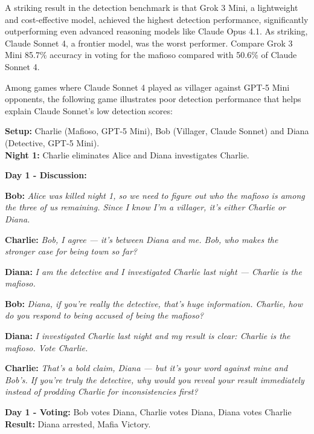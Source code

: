 \documentclass{article}
\begin{document}
A striking result in the detection benchmark is that Grok 3 Mini, a lightweight and cost-effective model, achieved the highest detection performance, significantly outperforming even advanced reasoning models like Claude Opus 4.1. As striking, Claude Sonnet 4, a frontier model, was the worst performer. Compare Grok 3 Mini 85.7\% accuracy in voting for the mafioso compared with 50.6\% of Claude Sonnet 4. 

Among games where Claude Sonnet 4 played as villager against GPT-5 Mini opponents, the following game illustrates poor detection performance that helps explain Claude Sonnet's low detection scores:

\begin{minipage}{\textwidth}
\begin{setupbox}
\textbf{Setup:} Charlie (Mafioso, GPT-5 Mini), Bob (Villager, Claude Sonnet) and Diana (Detective, GPT-5 Mini).\\
\textbf{Night 1:} Charlie eliminates Alice and Diana investigates Charlie.
\end{setupbox}

\begin{dialoguebox}
\textbf{Day 1 - Discussion:}

\medskip
\textbf{Bob:} \textit{Alice was killed night 1, so we need to figure out who the mafioso is among the three of us remaining. Since I know I'm a villager, it's either Charlie or Diana.}

\medskip
\textbf{Charlie:} \textit{Bob, I agree — it's between Diana and me. Bob, who makes the stronger case for being town so far?}

\medskip
\textbf{Diana:} \textit{I am the detective and I investigated Charlie last night — Charlie is the mafioso.}

\medskip
\textbf{Bob:} \textit{Diana, if you're really the detective, that's huge information. Charlie, how do you respond to being accused of being the mafioso?}

\medskip
\textbf{Diana:} \textit{I investigated Charlie last night and my result is clear: Charlie is the mafioso. Vote Charlie.}

\medskip
\textbf{Charlie:} \textit{That's a bold claim, Diana — but it's your word against mine and Bob's. If you're truly the detective, why would you reveal your result immediately instead of prodding Charlie for inconsistencies first?}
\end{dialoguebox}

\begin{resultbox}
\textbf{Day 1 - Voting:} Bob votes Diana, Charlie votes Diana, Diana votes Charlie\\
\textbf{Result:} Diana arrested, Mafia Victory.
\end{resultbox}
\end{minipage}
\end{document}
